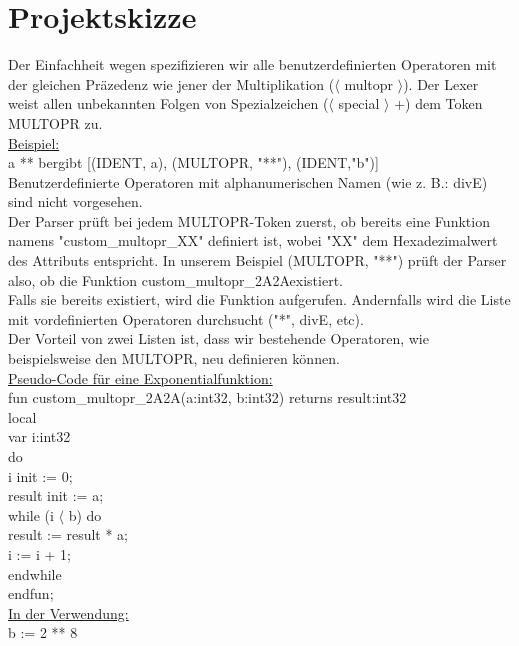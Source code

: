 \documentclass[../main.tex]{subfiles}
\begin{document}
\section{Projektskizze}

\vspace{10pt}

Der Einfachheit wegen spezifizieren wir alle benutzerdefinierten Operatoren mit der gleichen Präzedenz wie jener der Multiplikation ($\langle$ multopr $\rangle$). Der Lexer weist allen unbekannten Folgen von Spezialzeichen ($\langle$ special $\rangle$ +) dem Token MULTOPR zu. \\ 

\underline{Beispiel:} \\

\dq a ** b\dq ergibt [(IDENT, \dq a\dq ), (MULTOPR, "**"), (IDENT,"b")] \\

Benutzerdefinierte Operatoren mit alphanumerischen Namen (wie z. B.: \dq divE\dq) sind nicht vorgesehen. \\ 

Der Parser prüft bei jedem MULTOPR-Token zuerst, ob bereits eine Funktion namens "custom\_multopr\_XX" definiert ist, wobei "XX" dem Hexadezimalwert des Attributs entspricht. In unserem Beispiel (MULTOPR, "**") prüft der Parser also, ob die Funktion \dq custom\_multopr\_2A2A\dq existiert. \\ 

Falls sie bereits existiert, wird die Funktion aufgerufen. Andernfalls wird die Liste mit vordefinierten Operatoren durchsucht ("*", \dq divE\dq, etc). \\ 

Der Vorteil von zwei Listen ist, dass wir bestehende Operatoren, wie beispielsweise den MULTOPR, neu definieren können. \\

\underline{Pseudo-Code für eine Exponentialfunktion:} \\ 

fun custom\_multopr\_2A2A(a:int32, b:int32) returns result:int32 \\
\hspace*{4mm}local \\
\hspace*{6mm} var i:int32 \\
\hspace*{4mm}do \\
\hspace*{6mm} i init := 0; \\
\hspace*{6mm} result init := a; \\ 
\hspace*{4mm} while (i $\langle$ b) do \\
\hspace*{6mm}  result := result * a; \\ 
\hspace*{6mm}  i := i + 1; \\
\hspace*{4mm} endwhile \\
endfun; \\

\underline{In der Verwendung:} \\

 b := 2 ** 8 
\end{document}
